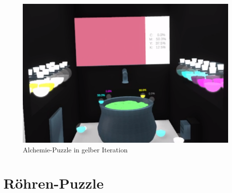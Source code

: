 \begin{figure}[h]
	\centering
	\includegraphics[width=\textwidth/2]{Pictures/Alchemie_Final}
	\caption{Alchemie-Puzzle in gelber Iteration}
	\label{fig:alchemie_final}
\end{figure}\newpage \noindent

\section{Röhren-Puzzle}
